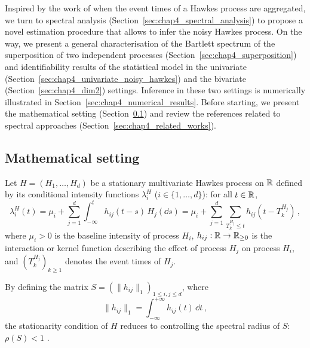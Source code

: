                Inspired by the work of \textcite{Cheysson2022} when the event times of a Hawkes process are aggregated, we turn to spectral analysis (Section~\ref{sec:chap4_spectral_analysis}) to propose a novel estimation procedure that allows to infer the noisy Hawkes process.
               On the way, we present a general characterisation of the Bartlett spectrum of the superposition of two independent processes (Section~\ref{sec:chap4_superposition})
               and identifiability results of the statistical model in the univariate (Section~\ref{sec:chap4_univariate_noisy_hawkes}) and the bivariate (Section~\ref{sec:chap4_dim2}) settings.
               Inference in these two settings is numerically illustrated in Section~\ref{sec:chap4_numerical_results}.
               Before starting, we present the mathematical setting (Section~\ref{sec:chap4_setting})
               and review the references related to spectral approaches (Section~\ref{sec:chap4_related_works}).


    
      \subsection{Mathematical setting}
      \label{sec:chap4_setting}
        Let $H = (H_1, \ldots, H_d)$ be a stationary multivariate Hawkes process on ${\mathbb R}$ defined by its conditional intensity functions $\lambda_i^H$ ($i \in \{1, \dots, d\}$):
        for all $t \in {\mathbb R}$,
        \begin{equation}\label{eq:chap4_hawkes_intensity}
          \lambda_i^H(t) = \mu_i + \sum_{j=1}^{d}\int_{-\infty}^{t}{h_{ij}(t-s) \, H_j(\dd s)} = \mu_i + \sum_{j=1}^{d}\sum_{T^{H_j}_k \leq t}{h_{ij}(t  - T_k^{H_j})}\,,
        \end{equation}
        where $\mu_i > 0$ is the baseline intensity of process $H_i$,
        $h_{ij} : {\mathbb R} \to {\mathbb R}_{\ge 0}$ is the interaction or kernel function describing the effect of process $H_j$ on process $H_i$,
        and $(T_k^{H_j})_{k\ge1}$ denotes the event times of $H_j$.
        
        By defining the matrix $S = (\|h_{ij}\|_1)_{1 \le i, j \le d}$,
        where
        \[\|h_{ij}\|_1 = \int_{-\infty}^{+\infty}{h_{ij}(t) \, \dd t}\,,\]
        the stationarity condition of $H$ reduces to controlling the spectral radius of $S$: $\rho(S)<1$ \parencite{Bremaud1996}. 
        

